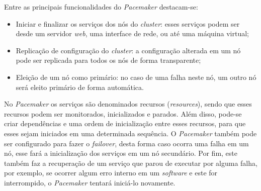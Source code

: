 Entre as principais funcionalidades do \textit{Pacemaker} destacam-se:
\begin{itemize}
 \item Iniciar e finalizar os serviços dos nós do \textit{cluster}: esses serviços podem ser desde um servidor \textit{web}, uma interface de 
 rede, ou até uma máquina virtual;
 \item Replicação de configuração do \textit{cluster}: a configuração alterada em um nó pode ser replicada para todos os nós de forma transparente;
 \item Eleição de um nó como primário: no caso de uma falha neste nó, um outro nó será eleito primário de forma automática.
\end{itemize}

No \textit{Pacemaker} os serviços são denominados recursos (\textit{resources}), sendo que esses recursos podem ser monitorados, inicializados e 
parados. Além disso, pode-se criar dependências e uma ordem de inicialização entre esses recursos, para que esses sejam iniciados em uma 
determinada sequência. O \textit{Pacemaker} também pode ser configurado para fazer o \textit{failover}, desta forma caso ocorra uma falha em 
um nó, esse fará a inicialização dos serviços em um nó secundário. Por fim, este também faz a recuperação de um serviço que parou de executar 
por alguma falha, por exemplo, se ocorrer algum erro interno em um \textit{software} e este for interrompido, o \textit{Pacemaker} 
tentará iniciá-lo novamente.

